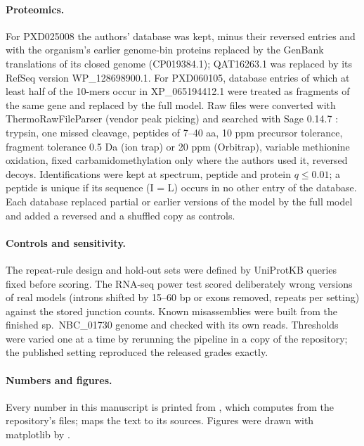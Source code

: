 \documentclass[11pt]{article}
\begin{document}
\paragraph{Proteomics.} For PXD025008 the authors' database was kept, minus their reversed entries and with the
organism's earlier genome-bin proteins replaced by the GenBank translations of its closed genome (CP019384.1); QAT16263.1
was replaced by its RefSeq version WP\_128698900.1. For PXD060105, database entries of which at least half of the 10-mers
occur in XP\_065194412.1 were treated as fragments of the same gene and replaced by the full model. Raw files were
converted with ThermoRawFileParser \citep{hulstaert2020} (vendor peak picking) and
searched with Sage 0.14.7 \citep{lazear2023}: trypsin, one missed cleavage, peptides of 7--40 aa, 10 ppm precursor
tolerance, fragment tolerance 0.5 Da (ion trap) or 20 ppm (Orbitrap), variable methionine oxidation, fixed
carbamidomethylation only where the authors used it, reversed decoys. Identifications were kept at spectrum, peptide and
protein $q \leq 0.01$; a peptide is unique if its sequence (I = L) occurs in no other entry of the database. Each database
replaced partial or earlier versions of the model by the full model and added a reversed and a shuffled copy as controls.

\paragraph{Controls and sensitivity.} The repeat-rule design and hold-out sets were defined by UniProtKB queries fixed
before scoring. The RNA-seq power test scored deliberately wrong versions of  real models (introns
shifted by 15--60 bp or exons removed,  repeats per setting) against the stored junction counts. Known
misassemblies were built from the finished  sp.\ NBC\_01730 genome and checked with its own reads.
Thresholds were varied one at a time by rerunning the pipeline in a copy of the repository; the published setting
reproduced the released grades exactly.

\paragraph{Numbers and figures.} Every number in this manuscript is printed from , which
 computes from the repository's files;  maps the text to its sources.
Figures were drawn with matplotlib by .
\end{document}

